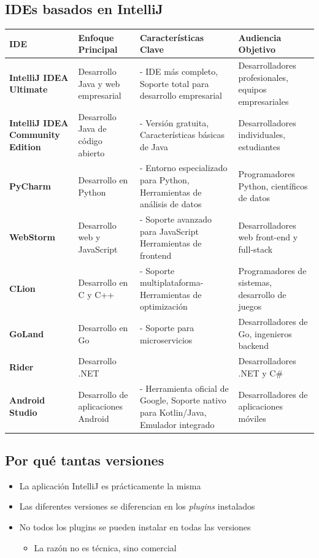 \documentclass[a4paper]{article}
\begin{document}
\subsection{IDEs basados en IntelliJ}
\label{sec:org0000027}

\begin{center}
\begin{tabular}{llll}
IDE & Enfoque Principal & Características Clave & Audiencia Objetivo\\
\hline
\textbf{IntelliJ IDEA Ultimate} & Desarrollo Java y web empresarial & - IDE más completo, Soporte total para desarrollo empresarial & Desarrolladores profesionales, equipos empresariales\\
\textbf{IntelliJ IDEA Community Edition} & Desarrollo Java de código abierto & - Versión gratuita, Características básicas de Java & Desarrolladores individuales, estudiantes\\
\textbf{PyCharm} & Desarrollo en Python & - Entorno especializado para Python, Herramientas de análisis de datos & Programadores Python, científicos de datos\\
\textbf{WebStorm} & Desarrollo web y JavaScript & - Soporte avanzado para JavaScript Herramientas de frontend & Desarrolladores web front-end y full-stack\\
\textbf{CLion} & Desarrollo en C y C++ & - Soporte multiplataforma- Herramientas de optimización & Programadores de sistemas, desarrollo de juegos\\
\textbf{GoLand} & Desarrollo en Go & - Soporte para microservicios & Desarrolladores de Go, ingenieros backend\\
\textbf{Rider} & Desarrollo .NET &  & Desarrolladores .NET y C\#\\
\textbf{Android Studio} & Desarrollo de aplicaciones Android & - Herramienta oficial de Google, Soporte nativo para Kotlin/Java, Emulador integrado & Desarrolladores de aplicaciones móviles\\
\end{tabular}
\end{center}
\subsection{Por qué tantas versiones}
\label{sec:org000002a}
\begin{itemize}
\item La aplicación IntelliJ es prácticamente la misma
\item Las diferentes versiones se diferencian en los \emph{plugins} instalados
\item No todos los plugins se pueden instalar en todas las versiones
\begin{itemize}
\item La razón no es técnica, sino comercial
\end{itemize}
\end{itemize}
\end{document}
